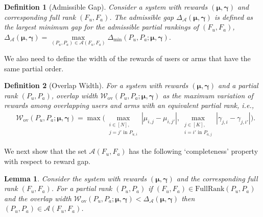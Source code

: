 \documentclass{article}
\newtheorem{lemma}[theorem]{Lemma}
\newtheorem{definition}{Definition}
\begin{document}
\begin{definition}[Admissible Gap]
    Consider a system with rewards $(\boldsymbol{\mu}, \boldsymbol{\gamma})$ and corresponding full rank $(F_u, F_a)$. The admissible gap $\Delta_{\mathcal{A}}(\boldsymbol{\mu}, \boldsymbol{\gamma})$ is defined as the largest minimum gap for the admissible partial rankings of $(F_u, F_a)$, 
    $\Delta_{\mathcal{A}}(\boldsymbol{\mu}, \boldsymbol{\gamma}) = \max\limits_{(P_{u}, P_{a}) \in \mathcal{A}(F_{u}, F_{a})} \Delta_{\min}(P_{u}, P_{a}; \boldsymbol{\mu}, \boldsymbol{\gamma}).$
\end{definition}
We also need to define the width of the rewards of users or arms that have the same partial order.
\begin{definition}[Overlap Width]
     For a system with rewards $(\boldsymbol{\mu}, \boldsymbol{\gamma})$ and a partial rank $(P_{u}, P_{a})$, overlap width $\mathcal{W}_{\mathrm{ov}}(P_{u}, P_{a}; \boldsymbol{\mu}, \boldsymbol{\gamma})$ as the maximum variation of rewards among overlapping users and arms with an equivalent partial rank, i.e.,
    \begin{align*}
        &\mathcal{W}_{\mathrm{ov}}(P_{u}, P_{a}; \boldsymbol{\mu}, \boldsymbol{\gamma}) = \max\big(\max\limits_{\substack{i \in [N],\\ j = j' \text{ in } P_{u,i}}} |\mu_{i,j} - \mu_{i, j'}|, \max\limits_{\substack{j \in [K],\\ i = i' \text{ in } P_{a,j}}} |\gamma_{j,i} - \gamma_{j, i'}|\big).
    \end{align*}
\end{definition}
We next show that the set $\mathcal{A}(F_{u}, F_{a})$ has the following `completeness' property with respect to reward gap. 
\begin{lemma}\label{lemm:structural-main}
    Consider the system with rewards $(\boldsymbol{\mu}, \boldsymbol{\gamma})$ and the corresponding full rank $(F_u, F_a)$. For a partial rank $(P_u, P_a)$ if $(F_u, F_a) \in \mathrm{FullRank}(P_u, P_a)$ and the overlap width $\mathcal{W}_{\mathrm{ov}}(P_u, P_a; \boldsymbol{\mu}, \boldsymbol{\gamma}) < \Delta_{\mathcal{A}}(\boldsymbol{\mu}, \boldsymbol{\gamma})$ then $(P_u, P_a) \in \mathcal{A}(F_u, F_a)$.
\end{lemma}
\end{document}
